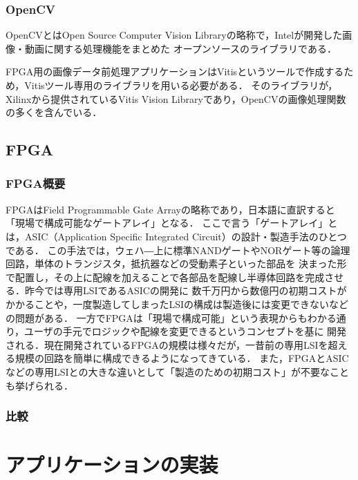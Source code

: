 \documentclass[11pt,a4j]{jreport}
\begin{document}
\subsection{OpenCV}
OpenCVとはOpen Source Computer Vision Libraryの略称で，Intelが開発した画像・動画に関する処理機能をまとめた
オープンソースのライブラリである．

FPGA用の画像データ前処理アプリケーションはVitisというツールで作成するため，Vitisツール専用のライブラリを用いる必要がある．
そのライブラリが，Xilinxから提供されているVitis Vision Libraryであり，OpenCVの画像処理関数の多くを含んでいる．

\section{FPGA}
\subsection{FPGA概要}
FPGAはField Programmable Gate Arrayの略称であり，日本語に直訳すると「現場で構成可能なゲートアレイ」となる．
ここで言う「ゲートアレイ」とは，ASIC（Application Specific Integrated Circuit）の設計・製造手法のひとつである．
この手法では，ウェハ―上に標準NANDゲートやNORゲート等の論理回路，単体のトランジスタ，抵抗器などの受動素子といった部品を
決まった形で配置し，その上に配線を加えることで各部品を配線し半導体回路を完成させる．昨今では専用LSIであるASICの開発に
数千万円から数億円の初期コストがかかることや，一度製造してしまったLSIの構成は製造後には変更できないなどの問題がある．
一方でFPGAは「現場で構成可能」という表現からもわかる通り，ユーザの手元でロジックや配線を変更できるというコンセプトを基に
開発される．現在開発されているFPGAの規模は様々だが，一昔前の専用LSIを超える規模の回路を簡単に構成できるようになってきている．
また，FPGAとASICなどの専用LSIとの大きな違いとして「製造のための初期コスト」が不要なことも挙げられる．


\subsection{比較}

\chapter{アプリケーションの実装}
\end{document}
